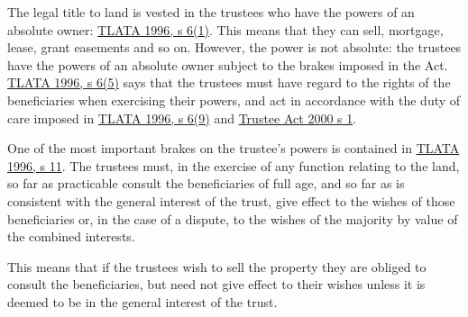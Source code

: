 \documentclass[
]{article}
\begin{document}
The legal title to land is vested in the trustees who have the powers of
an absolute owner:
\href{https://www.legislation.gov.uk/ukpga/1996/47/section/6}{TLATA
1996, s 6(1)}. This means that they can sell, mortgage, lease, grant
easements and so on. However, the power is not absolute: the trustees
have the powers of an absolute owner subject to the brakes imposed in
the Act.
\href{https://www.legislation.gov.uk/ukpga/1996/47/section/6}{TLATA
1996, s 6(5)} says that the trustees must have regard to the rights of
the beneficiaries when exercising their powers, and act in accordance
with the duty of care imposed in
\href{https://www.legislation.gov.uk/ukpga/1996/47/section/6}{TLATA
1996, s 6(9)} and
\href{https://www.legislation.gov.uk/ukpga/2000/29/section/1}{Trustee
Act 2000 s 1}.

One of the most important brakes on the trustee's powers is contained in
\href{https://www.legislation.gov.uk/ukpga/1996/47/section/11}{TLATA
1996, s 11}. The trustees must, in the exercise of any function relating
to the land, so far as practicable consult the beneficiaries of full
age, and so far as is consistent with the general interest of the trust,
give effect to the wishes of those beneficiaries or, in the case of a
dispute, to the wishes of the majority by value of the combined
interests.

This means that if the trustees wish to sell the property they are
obliged to consult the beneficiaries, but need not give effect to their
wishes unless it is deemed to be in the general interest of the trust.
\end{document}
